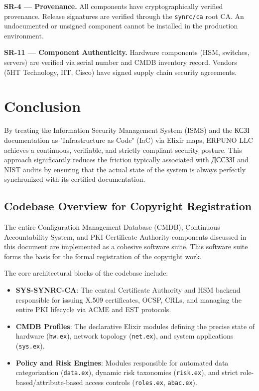 \documentclass{article}
\begin{document}
\textbf{SR-4 --- Provenance.}
All components have cryptographically verified provenance. Release signatures are verified through the \texttt{synrc/ca} root CA. An undocumented or unsigned component cannot be installed in the production environment.

\textbf{SR-11 --- Component Authenticity.}
Hardware components (HSM, switches, servers) are verified via serial number and CMDB inventory record. Vendors (5HT Technology, IIT, Cisco) have signed supply chain security agreements.

\section{Conclusion}
By treating the Information Security Management System (ISMS) and the \foreignlanguage{ukrainian}{КСЗІ} documentation as "Infrastructure as Code" (IaC) via Elixir maps, ERPUNO LLC achieves a continuous, verifiable, and strictly compliant security posture. This approach significantly reduces the friction typically associated with \foreignlanguage{ukrainian}{ДССЗЗІ} and NIST audits by ensuring that the actual state of the system is always perfectly synchronized with its certified documentation.

\subsection{Codebase Overview for Copyright Registration}
The entire Configuration Management Database (CMDB), Continuous Accountability System, and PKI Certificate Authority components discussed in this document are implemented as a cohesive software suite. This software suite forms the basis for the formal registration of the copyright work.

The core architectural blocks of the codebase include:
\begin{itemize}
    \item \textbf{SYS-SYNRC-CA}: The central Certificate Authority and HSM backend responsible for issuing X.509 certificates, OCSP, CRLs, and managing the entire PKI lifecycle via ACME and EST protocols.
    \item \textbf{CMDB Profiles}: The declarative Elixir modules defining the precise state of hardware (\texttt{hw.ex}), network topology (\texttt{net.ex}), and system applications (\texttt{sys.ex}).
    \item \textbf{Policy and Risk Engines}: Modules responsible for automated data categorization (\texttt{data.ex}), dynamic risk taxonomies (\texttt{risk.ex}), and strict role-based/attribute-based access controls (\texttt{roles.ex}, \texttt{abac.ex}).
\end{itemize}
\end{document}
